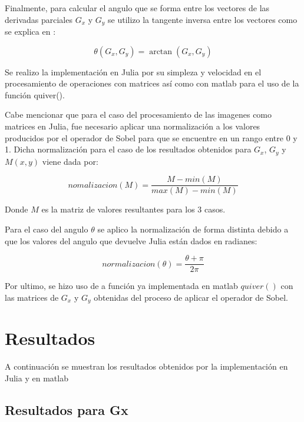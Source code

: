 \documentclass[11pt, letterpaper]{article}
\begin{document}
	Finalmente, para calcular el angulo que se forma entre los vectores de las derivadas parciales $G_x$ y $G_y$ se utilizo la tangente inversa entre los vectores como se explica en \cite{perez2018procesamiento}:
	
	$$\theta(G_x,G_y) = \arctan(G_x,G_y )$$
	
	Se realizo la implementación en Julia por su simpleza y velocidad en el procesamiento de operaciones con matrices así como con matlab para el uso de la función quiver().
	
	Cabe mencionar que para el caso del procesamiento de las imagenes como matrices en Julia, fue necesario aplicar una normalización a los valores producidos por el operador de Sobel para que se encuentre en un rango entre 0 y 1. Dicha normalización para el caso de los resultados obtenidos para $G_x$, $G_y$ y $M(x,y)$ viene dada por:
	
	$$nomalizacion(M) = \frac{M-min(M)}{max(M)-min(M)}$$
	
	Donde $M$ es la matriz de valores resultantes para los 3 casos.
	
	Para el caso del angulo $\theta$ se aplico la normalización de forma distinta debido a que los valores  del angulo que devuelve Julia están dados en radianes:
	
	$$normalizacion(\theta) = \frac{\theta + \pi}{2 \pi}$$
	
	Por ultimo, se hizo uso de a función ya implementada en matlab $quiver()$ con las matrices de $G_x$ y $G_y$	obtenidas del proceso de aplicar el operador de Sobel.
	
\newpage
	
\section{Resultados}

A continuación se muestran los resultados obtenidos por la implementación en Julia y en matlab

\subsection{Resultados para Gx}
\end{document}
